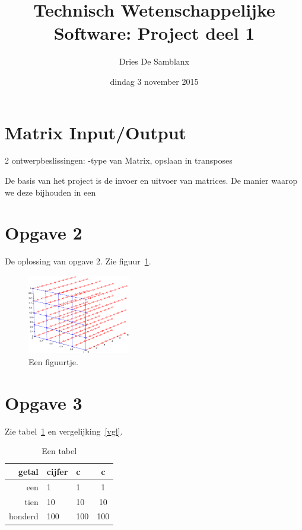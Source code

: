 \documentclass[a4paper]{article}
\title{Technisch Wetenschappelijke Software: Project deel 1}
\author{Dries De Samblanx}
\date{dindag 3 november 2015}
\newcommand{\opgave}[1]{\section*{Opgave #1}}
\begin{document}
\maketitle

\section*{Matrix Input/Output}

2 ontwerpbeslissingen: -type van Matrix, opslaan in transposes

De basis van het project is de invoer en uitvoer van matrices. De manier waarop we deze bijhouden in een 

\opgave{2}

De oplossing van opgave 2. Zie figuur~\ref{figuurtje}.

\begin{figure}
\begin{center}
\includegraphics[width=0.4\textwidth]{figuurtje.eps}
\end{center}
\caption{Een figuurtje.}
\label{figuurtje}
\end{figure}


\opgave{3}

Zie tabel~\ref{tab1} en vergelijking~\eqref{vgl}.

\begin{table}
\begin{center}
\begin{tabular}{r|llc}
getal & cijfer & c & c \\\hline
een & 1 & 1 & 1 \\
tien & 10 & 10 & 10 \\
honderd & 100 & 100 & 100
\end{tabular}
\end{center}
\caption{Een tabel}
\label{tab1}
\end{table}
\end{document}

